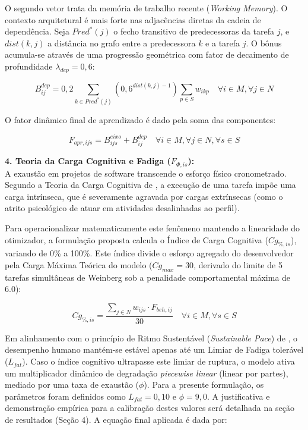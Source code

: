 \documentclass[a4paper,11pt]{article}
\begin{document}
O segundo vetor trata da memória de trabalho recente (\textit{Working Memory}). O contexto arquitetural é mais forte nas adjacências diretas da cadeia de dependência. Seja $Pred^*(j)$ o fecho transitivo de predecessoras da tarefa $j$, e $dist(k, j)$ a distância no grafo entre a predecessora $k$ e a tarefa $j$. O bônus acumula-se através de uma progressão geométrica com fator de decaimento de profundidade $\lambda_{dep} = 0,6$:

\begin{equation}
    B^{dep}_{ij} = 0,2 \sum_{k \in Pred^*(j)} \left( 0,6^{dist(k, j) - 1} \right) \sum_{p \in S} w_{ikp} \quad \forall i \in M, \forall j \in N
\end{equation}

O fator dinâmico final de aprendizado é dado pela soma das componentes:

\begin{equation}
    F_{apr, ijs} = B^{eixo}_{ijs} + B^{dep}_{ij} \quad \forall i \in M, \forall j \in N, \forall s \in S
\end{equation}

\vspace{0.2cm}
\noindent\textbf{4. Teoria da Carga Cognitiva e Fadiga ($F_{\Phi, is}$):} \\
A exaustão em projetos de software transcende o esforço físico cronometrado. Segundo a Teoria da Carga Cognitiva de \citet{sweller1988}, a execução de uma tarefa impõe uma carga intrínseca, que é severamente agravada por cargas extrínsecas (como o atrito psicológico de atuar em atividades desalinhadas ao perfil). 

Para operacionalizar matematicamente este fenômeno mantendo a linearidade do otimizador, a formulação proposta calcula o Índice de Carga Cognitiva ($Cg_{\%, is}$), variando de 0\% a 100\%. Este índice divide o esforço agregado do desenvolvedor pela Carga Máxima Teórica do modelo ($Cg_{max} = 30$, derivado do limite de 5 tarefas simultâneas de Weinberg sob a penalidade comportamental máxima de 6.0):

\begin{equation}
    Cg_{\%, is} = \frac{\sum_{j \in N} w_{ijs} \cdot F_{beh, ij}}{30} \quad \forall i \in M, \forall s \in S
\end{equation}

Em alinhamento com o princípio de Ritmo Sustentável (\textit{Sustainable Pace}) de \citet{beck1999}, o desempenho humano mantém-se estável apenas até um Limiar de Fadiga tolerável ($L_{fat}$). Caso o índice cognitivo ultrapasse este limiar de ruptura, o modelo ativa um multiplicador dinâmico de degradação \textit{piecewise linear} (linear por partes), mediado por uma taxa de exaustão ($\phi$). Para a presente formulação, os parâmetros foram definidos como $L_{fat} = 0,10$ e $\phi = 9,0$. A justificativa e demonstração empírica para a calibração destes valores será detalhada na seção de resultados (Seção 4). A equação final aplicada é dada por:
\end{document}
